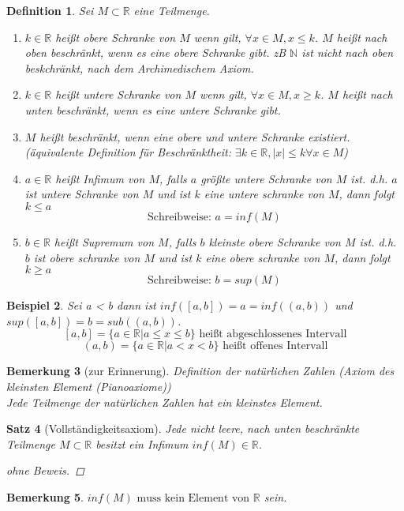 \documentclass[a4paper,titlepage,oneside]{article}
\def\N{\ensuremath{\mathbb{N}} }
\def\R{\ensuremath{\mathbb{R}} }
\newcommand{\fa}[1]{\ensuremath{\forall#1}}
\theoremstyle{thmstyle}
\newtheorem{satz}{Satz}[subsection]
\newtheorem{defi}[satz]{Definition}
\newtheorem{bsp}[satz]{Beispiel}
\newtheorem{bem}[satz]{Bemerkung}
\begin{document}
\begin{defi}
Sei $ M \subset \R$ eine Teilmenge.\begin{enumerate}
\item $k \in \R $ heißt obere Schranke von $M$ wenn gilt, $\fa x \in M, x \le k$. $M$ heißt nach oben beschränkt, wenn es eine obere Schranke gibt.
zB $\N$ ist nicht nach oben beskchränkt, nach dem Archimedischem Axiom.
\item $k \in \R $ heißt untere Schranke von $M$ wenn gilt, $\fa x \in M, x \ge k$. $M$ heißt nach unten beschränkt, wenn es eine untere Schranke gibt.
\item $M$ heißt beschränkt, wenn eine obere und untere Schranke existiert. 
(äquivalente Definition für Beschränktheit: $\exists k \in \R , |x| \le k \fa x \in M$)
\item $a \in \R$ heißt Infimum von $M$, falls $a$ größte untere Schranke von $M$ ist. d.h. $a$ ist untere Schranke von $M$ und ist $k$ eine untere schranke von $M$, dann folgt $k \le a$
\[\text{Schreibweise: } a = inf(M)\]
\item $b \in \R$ heißt Supremum von $M$, falls $b$ kleinste obere Schranke von $M$ ist. d.h. $b$ ist obere schranke von $M$ und ist $k$ eine obere schranke von $M$, dann folgt $k \ge a$
\[\text{Schreibweise: } b = sup(M)\]
\end{enumerate}
\end{defi}

\begin{bsp}
Sei a < b dann ist $inf( [a,b] ) = a = inf( (a,b) )$ und $ sup( [a,b] ) = b = sub( (a,b) )$.
\[[a, b] = \{a \in \R | a \le x \le b\} \text{ heißt abgeschlossenes Intervall}\]
\[(a, b) = \{a \in \R | a < x < b\} \text{ heißt offenes Intervall}\]
\end{bsp}

\begin{bem}[zur Erinnerung]
Definition der natürlichen Zahlen (Axiom des kleinsten Element (Pianoaxiome)) \\
Jede Teilmenge der natürlichen Zahlen hat ein kleinstes Element.
\end{bem}

\begin{satz}[Vollständigkeitsaxiom]
Jede nicht leere, nach unten beschränkte Teilmenge $M \subset \R$  besitzt ein Infimum $inf(M) \in \R$.
\begin{proof}[ohne Beweis] \end{proof}
\end{satz}

\begin{bem}
$inf(M) \text{ muss kein Element von } \R$ sein.
\end{bem}
\end{document}
